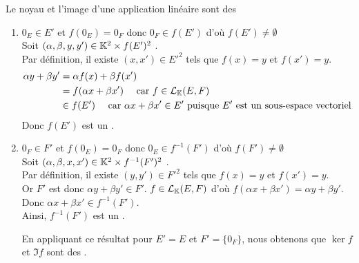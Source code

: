 \documentclass{article}
\renewenvironment{question_kholle}[2][ ]
{
	\subsection{\texorpdfstring{#2}{}}
	\notblank{#1}
	{
		\noindent #1
		\bigbreak
	}
	{}
	\begin{proof}
}
{
	\end{proof}
}
\begin{document}
\begin{question_kholle}
	[{
				Soit $f \in \mathcal{L}_\K(E, F)$.
				\begin{equation*}
					\begin{aligned}
						\ker f & = \left\{ x \in E \;|\; f(x) = 0_F \right\} = f^{-1} (\{0_F\}) \\
						\Im f  & = \left\{ y \in F \;|\; \exists x \in E : f(x) = y \right\}
					\end{aligned}
				\end{equation*}
				Nous démontrerons le résultat plus général suivant~:
				\begin{enumerate}[label=$(\roman*)$, labelindent=0pt, leftmargin=!]
					\item $f(E')$ est un \sev de $F$.
					\item $f^{-1}(F')$ est un \sev de $E$.
				\end{enumerate}
			}]
	{Le noyau et l'image d'une application linéaire sont des \sevs}
	\hfill\\
	\begin{enumerate}[label=$(\roman*)$, labelindent=0pt, leftmargin=!]
		\item $0_E \in E'$ et $f(0_E) = 0_F$ donc $0_F \in f(E')$ d'où $f(E') \neq \emptyset$ \\
		      Soit $(\alpha, \beta, y, y') \in \mathbb K^2 \times f(E')^2$ \fqs. \\
		      Par définition, il existe $(x, x') \in E'^2$ tels que $f(x) = y$ et $f(x') = y$.
		      \begin{equation*}
			      \begin{aligned}
				      \alpha y + \beta y'
				       & = \alpha f(x) + \beta f(x')                                                                     \\
				       & = f( \alpha x + \beta x' ) \quad \text{ car } f \in \mathcal{L}_{\mathbb K}(E, F)                        \\
				       & \in f(E') \quad \text{ car } \alpha x + \beta x' \in E' \text{ puisque } E' \text{ est un sous-espace vectoriel }
			      \end{aligned}
		      \end{equation*}
		      Donc $f(E')$ est un \sev.

		\item $0_F \in F'$ et $f(0_E) = 0_F$ donc $0_E \in f^{-1}(F')$ d'où $f(F') \neq \emptyset$ \\
		      Soit $(\alpha, \beta, x, x') \in \mathbb K^2 \times f^{-1}(F')^2$ \fqs. \\
		      Par définition, il existe $(y, y') \in F'^2$ tels que $f(x) = y$ et $f(x') = y$. \\
		      Or $F'$ est \sev donc $\alpha y + \beta y' \in F'$. $f \in \mathcal{L}_\K(E, F)$ d'où $f(\alpha x + \beta x') = \alpha y + \beta y'$. Donc $\alpha x + \beta x' \in f^{-1}(F')$. \\
		      Ainsi, $f^{-1}(F')$ est un \sev.

		      En appliquant ce résultat pour $E' = E$ et $F' = \{0_F\}$, nous obtenons que $\ker f$ et $\Im f$ sont des \sevs.
	\end{enumerate}
\end{question_kholle}
\end{document}
